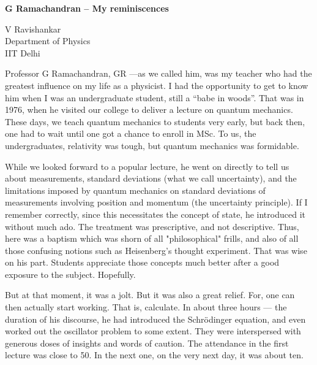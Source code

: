\setlength{\evensidemargin}{-0.1in}
\setlength{\oddsidemargin}{-0.2in}
\setlength{\topmargin}{-0.1in}
\setlength{\textwidth}{6.3in}
\setlength{\textheight}{9.5in}
\baselineskip20pt


\begin{center}
{\large\bf{ G Ramachandran -- My reminiscences}}
\end{center}
\begin{center}
{\large{V Ravishankar \\
Department of Physics \\
IIT Delhi}}
\vspace{0.1in}
\end{center}
\vspace{0.2in}

Professor G Ramachandran, GR —as we called him, was my teacher who had 
the greatest influence on my life as a physicist. I had the opportunity 
to get to know him when I was an undergraduate student, still a “babe in 
woods”. That was in 1976, when he visited our college to deliver a 
lecture on quantum mechanics. These days, we teach quantum mechanics to 
students very early, but back then, one had to wait until one got a 
chance to enroll in MSc. To us, the undergraduates, relativity was tough, 
but quantum mechanics was formidable.

While we looked forward to a popular lecture, he went on directly to 
tell us about measurements, standard deviations (what we call 
uncertainty), and the limitations imposed by quantum mechanics on 
standard deviations of measurements involving position and momentum (the 
uncertainty principle). If I remember correctly, since this necessitates 
the concept of state, he introduced it without much ado. The treatment 
was prescriptive, and not descriptive.  Thus, here was a baptism which 
was shorn of all "philosophical" frills, and also of all those confusing 
notions such as Heisenberg's thought experiment. That was wise on his 
part. Students appreciate those concepts much better after a good 
exposure to the subject. Hopefully.

But at that moment, it was a jolt.  But it was also a great relief. For, 
one can then actually start working. That is, calculate. In about three 
hours --- the duration of his discourse, he had introduced the 
Schr\"{o}dinger equation, and even worked out the oscillator problem to 
some extent. They were interspersed with generous doses of insights and 
words of caution. The attendance in the first lecture was close to 50. 
In the next one, on the very next day, it was about ten.

